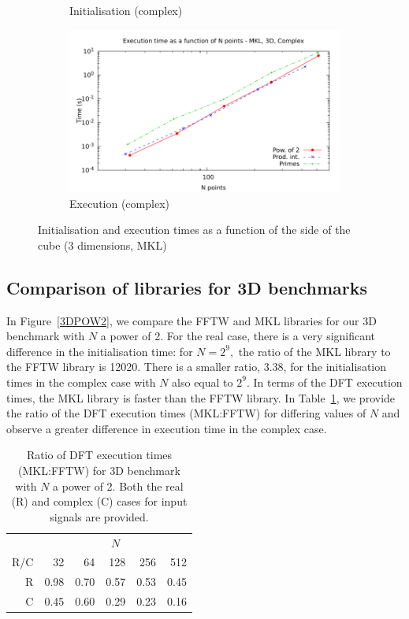 \documentclass[12pt, a4paper]{article} \setlength{\textheight}{24cm}
\begin{document}
\begin{figure}[H]
\begin{subfigure}{.5\textwidth}
    \caption{Initialisation (complex)}
    \label{3DMKLCI}
  \end{subfigure}%
  \begin{subfigure}{.5\textwidth}
    \centering
    \includegraphics[width=.9\linewidth]{graphs/3d-mkl-exec-c.pdf}
    \caption{Execution (complex)}
    \label{3DMKLC}
  \end{subfigure}
  \caption{Initialisation and execution times as a function of the
    side of the cube (3 dimensions, MKL)}
  \label{3DMKL}
\end{figure}

\subsection{Comparison of libraries for 3D benchmarks}

In Figure~\ref{3DPOW2}, we compare the FFTW and MKL libraries for our
3D benchmark with $N$ a power of 2. For the real case, there is a very
significant difference in the initialisation time: for $N=2^9,$ the
ratio of the MKL library to the FFTW library is 12020. There is a
smaller ratio, 3.38, for the initialisation times in the complex case
with $N$ also equal to $2^9.$ In terms of the DFT execution times, the
MKL library is faster than the FFTW library. In
Table~\ref{Tbl:3DPOW2}, we provide the ratio of the DFT execution
times (MKL:FFTW) for differing values of $N$ and observe a greater
difference in execution time in the complex case.

\begin{table}[H]
  \centering
  \begin{tabular}{|r|rrrrr|}
    \hline
    & \multicolumn{5}{|c|}{$N$ }   \\
    R/C & 32 & 64 & 128 & 256 & 512 \\
    \hline
    R & 0.98 & 0.70 & 0.57 & 0.53 & 0.45 \\
    C & 0.45 & 0.60 & 0.29 & 0.23 & 0.16 \\
    \hline
  \end{tabular}
  \caption{Ratio of DFT execution times (MKL:FFTW) for 3D benchmark with $N$ a power of 2. Both the real (R) and complex (C) cases for input signals are provided.}\label{Tbl:3DPOW2}
\end{table}
\end{document}
